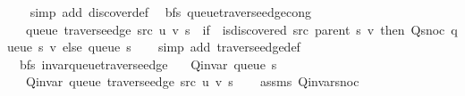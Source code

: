 \begin{isabellebody}
%
\isadelimproof
\ \ %
\endisadelimproof
%
\isatagproof
{}\isamarkupfalse%
\ {\isacharparenleft}{\kern0pt}simp\ add{\isacharcolon}{\kern0pt}\ discover{\isacharunderscore}{\kern0pt}def{\isacharparenright}{\kern0pt}%
\endisatagproof
{\isafoldproof}%
%
\isadelimproof
\isanewline
%
\endisadelimproof
\isanewline
{}\isamarkupfalse%
\ {\isacharparenleft}{\kern0pt}\ bfs{\isacharparenright}{\kern0pt}\ queue{\isacharunderscore}{\kern0pt}traverse{\isacharunderscore}{\kern0pt}edge{\isacharunderscore}{\kern0pt}cong{\isacharcolon}{\kern0pt}\isanewline
\ \ \ {\isachardoublequoteopen}queue\ {\isacharparenleft}{\kern0pt}traverse{\isacharunderscore}{\kern0pt}edge\ src\ u\ v\ s{\isacharparenright}{\kern0pt}\ {\isacharequal}{\kern0pt}\ {\isacharparenleft}{\kern0pt}if\ {\isasymnot}\ is{\isacharunderscore}{\kern0pt}discovered\ src\ {\isacharparenleft}{\kern0pt}parent\ s{\isacharparenright}{\kern0pt}\ v\ then\ Q{\isacharunderscore}{\kern0pt}snoc\ {\isacharparenleft}{\kern0pt}queue\ s{\isacharparenright}{\kern0pt}\ v\ else\ queue\ s{\isacharparenright}{\kern0pt}{\isachardoublequoteclose}\isanewline
%
\isadelimproof
\ \ %
\endisadelimproof
%
\isatagproof
{}\isamarkupfalse%
\ {\isacharparenleft}{\kern0pt}simp\ add{\isacharcolon}{\kern0pt}\ traverse{\isacharunderscore}{\kern0pt}edge{\isacharunderscore}{\kern0pt}def{\isacharparenright}{\kern0pt}%
\endisatagproof
{\isafoldproof}%
%
\isadelimproof
\isanewline
%
\endisadelimproof
%
\isadeliminvisible
\isanewline
%
\endisadeliminvisible
%
\isataginvisible
{}\isamarkupfalse%
\ {\isacharparenleft}{\kern0pt}\ bfs{\isacharparenright}{\kern0pt}\ invar{\isacharunderscore}{\kern0pt}queue{\isacharunderscore}{\kern0pt}traverse{\isacharunderscore}{\kern0pt}edge{\isacharcolon}{\kern0pt}\isanewline
\ \ \ {\isachardoublequoteopen}Q{\isacharunderscore}{\kern0pt}invar\ {\isacharparenleft}{\kern0pt}queue\ s{\isacharparenright}{\kern0pt}{\isachardoublequoteclose}\isanewline
\ \ \ {\isachardoublequoteopen}Q{\isacharunderscore}{\kern0pt}invar\ {\isacharparenleft}{\kern0pt}queue\ {\isacharparenleft}{\kern0pt}traverse{\isacharunderscore}{\kern0pt}edge\ src\ u\ v\ s{\isacharparenright}{\kern0pt}{\isacharparenright}{\kern0pt}{\isachardoublequoteclose}%
\endisataginvisible
{\isafoldinvisible}%
%
\isadeliminvisible
\isanewline
%
\endisadeliminvisible
%
\isadelimproof
\ \ %
\endisadelimproof
%
\isatagproof
{}\isamarkupfalse%
\ assms\ Q{\isachardot}{\kern0pt}invar{\isacharunderscore}{\kern0pt}snoc\isanewline

\end{isabellebody}
